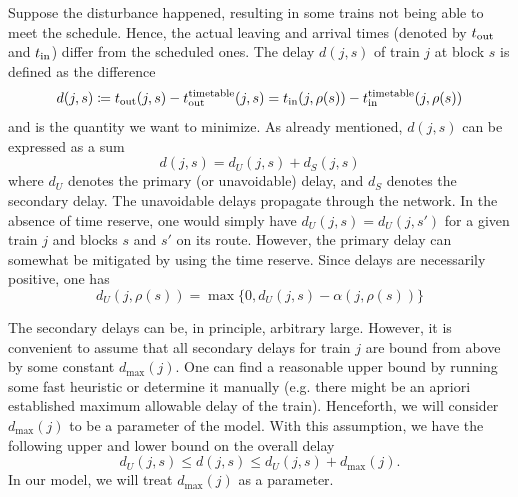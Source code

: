 Suppose the disturbance happened, resulting in some trains not being able to meet the schedule.
Hence, the actual leaving and arrival times (denoted by $t_\text{out}$ and $t_\text{in}$) differ from the
scheduled ones. The delay $d(j, s)$ of train $j$ at block $s$ is defined as the difference
\begin{equation}
\label{eq:djs}
d(j, s) \coloneqq t_\text{out}(j, s) - t_\text{out}^\text{timetable}(j, s) = t_\text{in}(j, \rho(s)) - t_\text{in}^\text{timetable}(j, \rho(s))
\end{equation}
and is the quantity we want to minimize. As already mentioned, $d(j, s)$ can be expressed as a sum
\begin{equation}
d(j, s) = d_U(j, s) + d_S(j, s)
\end{equation}
where $d_U$ denotes the primary (or unavoidable) delay, and $d_S$ denotes the secondary delay. The
unavoidable delays propagate through the network. In the absence of time reserve, one would simply
have $d_U(j, s) = d_U(j, s')$ for a given train $j$ and blocks $s$ and $s'$ on its route. However,
the primary delay can somewhat be mitigated by using the time reserve. Since delays are necessarily
positive, one has
\begin{equation}
    d_U(j, \rho(s)) = \max\{0, d_U(j, s) - \alpha(j, \rho(s))\}
\end{equation}

The secondary delays can be, in principle, arbitrary large. However, it is convenient to assume that
all secondary delays for train $j$ are bound from above by some constant $d_{\max}(j)$. One can find
a reasonable upper bound by running some fast heuristic or determine it manually (e.g. there might
be an apriori established maximum allowable delay of the train). Henceforth, we will consider
$d_{\max}(j)$ to be a parameter of the model. With this assumption, we have the following upper and
lower bound on the overall delay
\begin{equation}
d_U(j, s) \le d(j, s) \le d_U(j, s) + d_{\max}(j).
\end{equation}
In our model, we will treat $d_{\max}(j)$ as a parameter.

